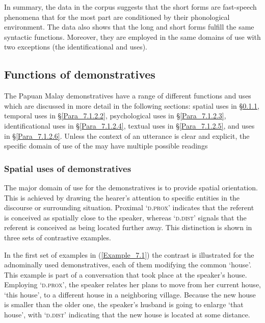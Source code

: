{In summary, the data in the corpus suggests that the short  forms are fast-speech phenomena that for the most part are conditioned by their phonological environment. The data also shows that the long and short  forms fulfill the same syntactic functions. Moreover, they are employed in the same domains of use with two exceptions (the identificational and  uses).


\subsection{Functions of demonstratives}
\label{Para_7.1.2}
The Papuan Malay demonstratives have a range of different functions and uses which are discussed in more detail in the following sections: spatial uses in §\ref{Para_7.1.2.1}, temporal uses in §\ref{Para_7.1.2.2}, psychological uses in §\ref{Para_7.1.2.3}, identificational uses in §\ref{Para_7.1.2.4}, textual uses in §\ref{Para_7.1.2.5}, and  uses in §\ref{Para_7.1.2.6}. Unless the context of an utterance is clear and explicit, the specific domain of use of the  may have multiple possible readings


\subsubsection[Spatial uses of demonstratives]{Spatial uses of demonstratives}
\label{Para_7.1.2.1}
The major domain of use for the demonstratives is to provide spatial orientation. This is achieved by drawing the hearer’s attention to specific entities in the discourse or surrounding situation. Proximal  ‘\textsc{d.prox}’ indicates that the referent is conceived as spatially close to the speaker, whereas  ‘\textsc{d.dist}’ signals that the referent is conceived as being located further away. This distinction is shown in three sets of contrastive examples.



In the first set of examples in (\ref{Example_7.1}) the contrast is illustrated for the adnominally used demonstratives, each of them modifying the common   ‘house’. This example is part of a conversation that took place at the speaker’s house. Employing  ‘\textsc{d.prox}’, the speaker relates her plans to move from her current house,  ‘this house’, to a different house in a neighboring village. Because the new house is smaller than the older one, the speaker’s husband is going to enlarge  ‘that house’, with  ‘\textsc{d.dist}’ indicating that the new house is located at some distance.


}
